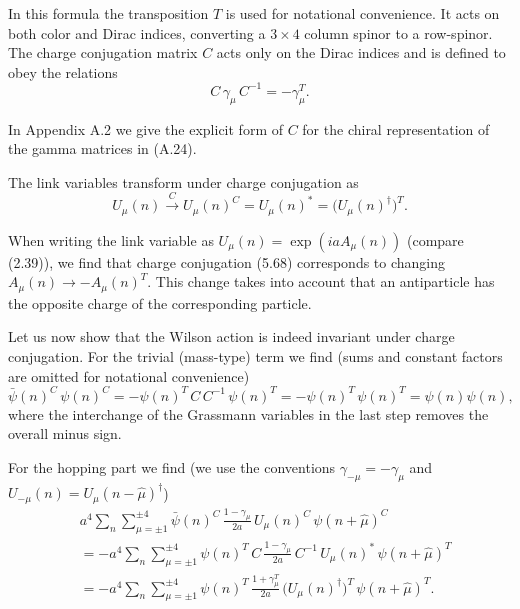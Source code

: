 In this formula the transposition $T$ is used for notational convenience. It acts
on both color and Dirac indices, converting a $3 \times 4$ column spinor to a row-spinor. The charge conjugation matrix $C$ acts only on the Dirac indices and
is defined to obey the relations
\begin{equation}
  C\,\gamma_\mu\,C^{-1} = -\gamma_\mu^T .
\end{equation}

In Appendix A.2 we give the explicit form of $C$ for the chiral representation
of the gamma matrices in (A.24).

The link variables transform under charge conjugation as
\begin{equation}
  U_\mu(n) \xrightarrow{\;C\;} U_\mu(n)^C = U_\mu(n)^* = \big(U_\mu(n)^\dagger\big)^T .
\end{equation}

When writing the link variable as $U_\mu(n) = \exp(iaA_\mu(n))$ (compare (2.39)),
we find that charge conjugation (5.68) corresponds to changing $A_\mu(n) \to
-A_\mu(n)^T$. This change takes into account that an antiparticle has the opposite
charge of the corresponding particle.

Let us now show that the Wilson action is indeed invariant under charge
conjugation. For the trivial (mass-type) term we find (sums and constant
factors are omitted for notational convenience)
\begin{equation}
  \bar{\psi}(n)^C\,\psi(n)^C = -\psi(n)^T\,C\,C^{-1}\,\psi(n)^T
    = -\psi(n)^T\,\psi(n)^T = \psi(n)\psi(n) ,
\end{equation}
where the interchange of the Grassmann variables in the last step removes the
overall minus sign.

For the hopping part we find (we use the conventions $\gamma_{-\mu} = -\gamma_\mu$ and
$U_{-\mu}(n) = U_\mu(n-\hat{\mu})^\dagger$)
\begin{equation}
  \begin{aligned}
    &a^4\sum_{n}\sum_{\mu=\pm1}^{\pm4}\bar{\psi}(n)^C\,
      \frac{1-\gamma_\mu}{2a}\,U_\mu(n)^C\,\psi(n+\hat{\mu})^C\\
    &= -a^4\sum_{n}\sum_{\mu=\pm1}^{\pm4}\psi(n)^T\,C\,
      \frac{1-\gamma_\mu}{2a}\,C^{-1}\,U_\mu(n)^*\,\psi(n+\hat{\mu})^T\\
    &= -a^4\sum_{n}\sum_{\mu=\pm1}^{\pm4}\psi(n)^T\,
      \frac{1+\gamma_\mu^T}{2a}\,\big(U_\mu(n)^\dagger\big)^T\,\psi(n+\hat{\mu})^T .
  \end{aligned}
\end{equation}

